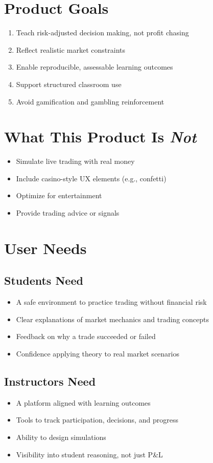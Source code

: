 \documentclass[12pt]{article}
\begin{document}
\section*{Product Goals}
\begin{enumerate}
    \item Teach risk-adjusted decision making, not profit chasing
    \item Reflect realistic market constraints
    \item Enable reproducible, assessable learning outcomes
    \item Support structured classroom use
    \item Avoid gamification and gambling reinforcement
\end{enumerate}

\section*{What This Product Is \emph{Not}}
\begin{itemize}
    \item Simulate live trading with real money
    \item Include casino-style UX elements (e.g., confetti)
    \item Optimize for entertainment
    \item Provide trading advice or signals
\end{itemize}

\section*{User Needs}

\subsection*{Students Need}
\begin{itemize}
    \item A safe environment to practice trading without financial risk
    \item Clear explanations of market mechanics and trading concepts
    \item Feedback on why a trade succeeded or failed
    \item Confidence applying theory to real market scenarios
\end{itemize}

\subsection*{Instructors Need}
\begin{itemize}
    \item A platform aligned with learning outcomes
    \item Tools to track participation, decisions, and progress
    \item Ability to design simulations
    \item Visibility into student reasoning, not just P\&L
\end{itemize}
\end{document}
